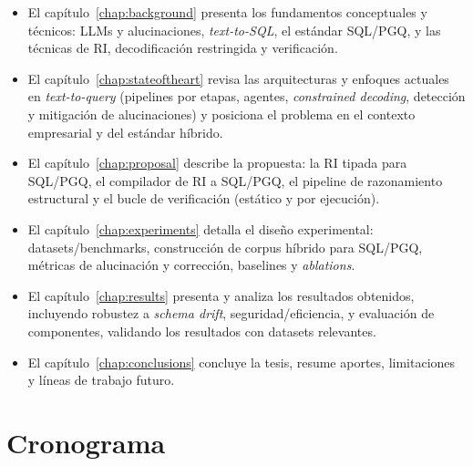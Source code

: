 \begin{itemize}
	\item El capítulo~\ref{chap:background} presenta los fundamentos conceptuales y técnicos: \acp{LLM} y alucinaciones, \emph{text-to-SQL}, el estándar \ac{SQL}/\ac{PGQ}, y las técnicas de \ac{RI}, decodificación restringida y verificación.
	\item El capítulo~\ref{chap:stateoftheart} revisa las arquitecturas y enfoques actuales en \emph{text-to-query} (pipelines por etapas, agentes, \emph{constrained decoding}, detección y mitigación de alucinaciones) y posiciona el problema en el contexto empresarial y del estándar híbrido.
	\item El capítulo~\ref{chap:proposal} describe la propuesta: la \ac{RI} tipada para \ac{SQL}/\ac{PGQ}, el compilador de \ac{RI} a \ac{SQL}/\ac{PGQ}, el pipeline de razonamiento estructural y el bucle de verificación (estático y por ejecución).
	\item El capítulo~\ref{chap:experiments} detalla el diseño experimental: datasets/benchmarks, construcción de corpus híbrido para \ac{SQL}/\ac{PGQ}, métricas de alucinación y corrección, baselines y \emph{ablations}.
	\item El capítulo~\ref{chap:results} presenta y analiza los resultados obtenidos, incluyendo robustez a \emph{schema drift}, seguridad/eficiencia, y evaluación de componentes, validando los resultados con datasets relevantes.
	\item El capítulo~\ref{chap:conclusions} concluye la tesis, resume aportes, limitaciones y líneas de trabajo futuro.
\end{itemize}



\section{Cronograma}

